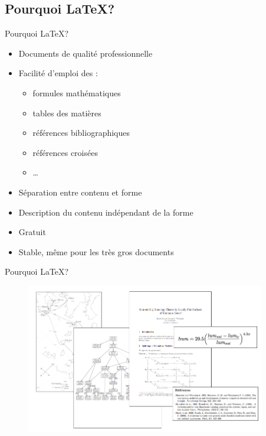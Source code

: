 \documentclass[10pt,svgnames,usenames,table]{beamer} %
\begin{document}
\subsection{Pourquoi \LaTeX{}?}
\begin{frame}{Pourquoi \LaTeX{}?}

  \begin{itemize}
  	\item Documents de qualité professionnelle
	\item Facilité d'emploi des :
	\begin{itemize}
		\item formules mathématiques
		\item tables des matières
		\item références bibliographiques
		\item références croisées
        \item \ldots{}
	\end{itemize}
	\item Séparation entre contenu et forme
	\item Description du contenu indépendant de la forme
	\item Gratuit
	\item Stable, même pour les très gros documents
  \end{itemize}
\end{frame}

\begin{frame}{Pourquoi \LaTeX{}?}

\begin{figure}[htbp]
\begin{center}
\includegraphics[height=6.5cm]{latex_exemples}
\end{center}
\end{figure}
\end{frame}

\end{document}
